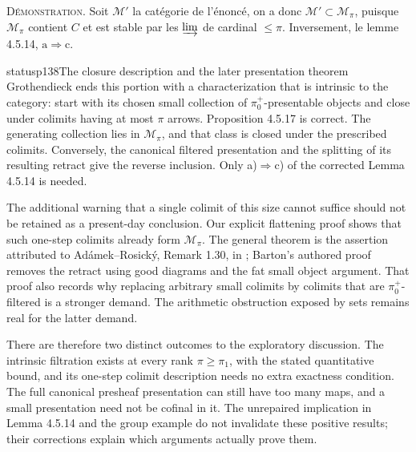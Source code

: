 \textsc{Démonstration}. Soit $\mathcal{M}'$ la catégorie de l'énoncé, on a donc $\mathcal{M}' \subset \mathcal{M}_{\pi}$, puisque $\mathcal{M}_{\pi}$ contient $C$ et est stable par les $\varinjlim$ de cardinal $\leqslant \pi$. Inversement, le lemme 4.5.14, $\mathrm{a} \Longrightarrow \mathrm{c}$.


\begin{dcomment}{status}{p138}{The closure description and the later presentation theorem}
Grothendieck ends this portion with a characterization that is intrinsic to the category: start with its chosen small collection of $\pi_0^+$-presentable objects and close under colimits having at most $\pi$ arrows. Proposition 4.5.17 is correct. The generating collection lies in $\mathcal M_\pi$, and that class is closed under the prescribed colimits. Conversely, the canonical filtered presentation and the splitting of its resulting retract give the reverse inclusion. Only a)$\Rightarrow$c) of the corrected Lemma 4.5.14 is needed.

The additional warning that a single colimit of this size cannot suffice should not be retained as a present-day conclusion. Our explicit flattening proof shows that such one-step colimits already form $\mathcal M_\pi$. The general theorem is the assertion attributed to Ad\'amek--Rosick\'y, Remark 1.30, in \citet{Barton2019Presentable}; Barton's authored proof removes the retract using good diagrams and the fat small object argument. That proof also records why replacing arbitrary small colimits by colimits that are $\pi_0^+$-filtered is a stronger demand. The arithmetic obstruction exposed by sets remains real for the latter demand.

There are therefore two distinct outcomes to the exploratory discussion. The intrinsic filtration exists at every rank $\pi\geq\pi_1$, with the stated quantitative bound, and its one-step colimit description needs no extra exactness condition. The full canonical presheaf presentation can still have too many maps, and a small presentation need not be cofinal in it. The unrepaired implication in Lemma 4.5.14 and the group example do not invalidate these positive results; their corrections explain which arguments actually prove them.
\end{dcomment}
